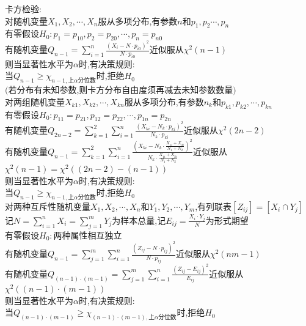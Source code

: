 \begin{dingyi}
卡方检验:\\
对随机变量$X_1,X_2,\cdots,X_n$服从多项分布,有参数$n$和$p_1,p_2\cdots,p_n$\\
有零假设$H_0:p_1=p_{10},p_2=p_{20},\cdots,p_n=p_{n0}$\\
有随机变量$Q_{n-1}=\sum\limits_{i=1}^{n}\frac{(X_i-N\cdot p_{i0})^2}{N\cdot p_{i0}}$近似服从$\chi^2(n-1)$\\
则当显著性水平为$\alpha$时,有决策规则:\\
当$Q_{n-1}\geq \chi_{n-1,\text{上}\alpha\text{分位数}}$时,拒绝$H_0$\\
$($若分布有未知参数,则卡方分布自由度须再减去未知参数数量$)$\\
对两组随机变量$X_{k1},X_{k2},\cdots,X_{kn}$服从多项分布,有参数$n_k$和$p_{k1},p_{k2},\cdots,p_{kn}$\\
有零假设$H_0:p_{11}=p_{21},p_{12}=p_{22},\cdots,p_{1n}=p_{2n}$\\
有随机变量$Q_{2n-2}=\sum\limits_{k=1}^{2}\sum\limits_{i=1}^{n}\frac{(X_{ki}-N_k\cdot p_{ki})^2}{N_k\cdot p_{ki}}$近似服从$\chi^2(2n-2)$\\
有随机变量$Q_{n-1}=\sum\limits_{k=1}^{2}\sum\limits_{i=1}^{n}\frac{(X_{ki}-N_k\cdot \frac{X_{1i}+X_{2i}}{N_1+N_2})^2}{N_k\cdot \frac{X_{1i}+X_{2i}}{N_1+N_2}}$近似服从$\chi^2(n-1)=\chi^2((2n-2)-(n-1))$\\
则当显著性水平为$\alpha$时,有决策规则:\\
当$Q_{n-1}\geq \chi_{n-1,\text{上}\alpha\text{分位数}}$时,拒绝$H_0$\\
对两种互斥性随机变量$X_1,X_2,\cdots,X_n$和$Y_1,Y_2,\cdots,Y_m$,有列联表$[Z_{ij}]=[X_i\cap Y_j]$\\
记$N=\sum\limits_{i=1}^{n}X_i=\sum\limits_{j=1}^{m}Y_j$为样本总量,记$E_{ij}=\frac{X_i\cdot Y_j}{N}$为形式期望\\
有零假设$H_0:$两种属性相互独立\\
有随机变量$Q_{n-1}=\sum\limits_{j=1}^{m}\sum\limits_{i=1}^{n}\frac{(Z_{ij}-N\cdot p_{ij})^2}{N\cdot p_{ij}}$近似服从$\chi^2(nm-1)$\\
有随机变量$Q_{(n-1)\cdot(m-1)}=\sum\limits_{j=1}^{m}\sum\limits_{i=1}^{n}\frac{(Z_{ij}-E_{ij})^2}{E_{ij}}$近似服从$\chi^2((n-1)\cdot(m-1))$\\
则当显著性水平为$\alpha$时,有决策规则:\\
当$Q_{(n-1)\cdot(m-1)}\geq \chi_{(n-1)\cdot(m-1),\text{上}\alpha\text{分位数}}$时,拒绝$H_0$
\end{dingyi}

